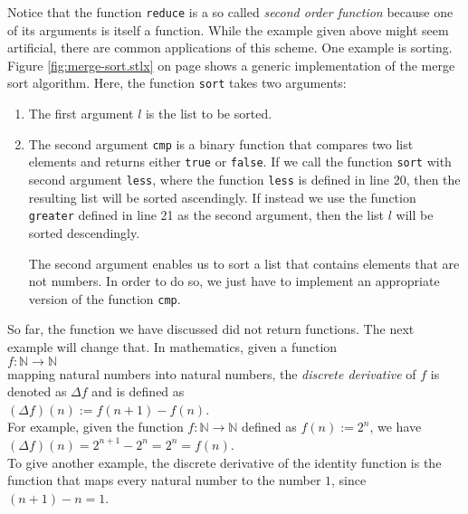 Notice that the function \texttt{reduce} is a so called \emph{second order function} because
one of its arguments is itself a function.  While the example given above might seem
artificial, there are common applications of this scheme.  One example is sorting.
Figure \ref{fig:merge-sort.stlx} on page \pageref{fig:merge-sort.stlx} shows a generic
implementation of the merge sort algorithm.  Here, the function \texttt{sort} takes two
arguments:
\begin{enumerate}
\item The first argument $l$ is the list to be sorted.
\item The second argument \texttt{cmp} is a binary function that compares two list elements
      and returns either \texttt{true} or \texttt{false}.  If we call the function
      \texttt{sort} with second argument \texttt{less}, where the function \texttt{less} is
      defined in line 20, then the resulting list will be sorted ascendingly.
      If instead we use the function \texttt{greater} defined in line 21 as the second
      argument, then the list $l$ will be sorted descendingly.

      The second argument enables us to sort a list that contains elements that are not
      numbers.  In order to do so, we just have to implement an appropriate version of the
      function \texttt{cmp}.
\end{enumerate}
So far, the function we have discussed did not return functions.  The next example will change
that.  In mathematics, given a function
\\[0.2cm]
\hspace*{1.3cm}
$f: \mathbb{N} \rightarrow \mathbb{N}$
\\[0.2cm]
mapping natural numbers into natural numbers, the \emph{discrete derivative} of $f$ is denoted
as $\Delta f$ and is defined as
\\[0.2cm]
\hspace*{1.3cm}
$(\Delta f)(n) := f(n+1) - f(n)$.
\\[0.2cm]
For example, given the function $f: \mathbb{N} \rightarrow \mathbb{N}$ defined as $f(n) := 2^n$,
we have
\\[0.2cm]
\hspace*{1.3cm}
$(\Delta f)(n) = 2^{n+1} - 2^n = 2^n = f(n)$.
\\[0.2cm]
To give another example, the discrete derivative of the identity function is the function that
maps every natural number to the number $1$, since $(n+1) - n = 1$.  

